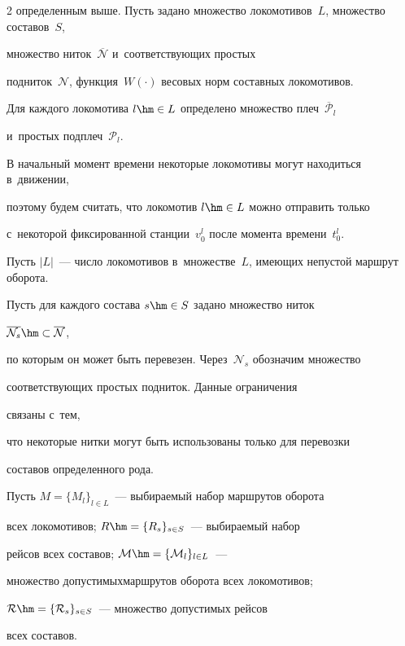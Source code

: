 \begin{multicols}{2}
определенным выше. Пусть задано множество локомотивов~$L$, множество составов~$S$, 


множество ниток~$\overline{\mathcal N}$ и~соответствующих простых 


подниток~$\mathcal N$, функция~$W(\cdot)$ весовых норм составных локомотивов. 


Для каждого локомотива $l\hm\in L$ определено множество плеч~$\overline{\mathcal P}_l$ 


и~простых подплеч~$\mathcal P_l$.





В начальный момент времени некоторые локомотивы могут находиться в~движении, 


поэтому будем считать, что локомотив $l\hm\in L$ можно отправить только 


с~некоторой фиксированной станции~$v_0^l$ после момента времени~$t_0^l$.


Пусть  $|L|$~--- число локомотивов в~множестве~$L$, имеющих непустой маршрут оборота.





Пусть для каждого состава $s\hm\in S$ задано множество ниток


 $\overline{\mathcal N_s}\hm\subset \overline{\mathcal N}$, 


 по которым он может быть перевезен. Через~$\mathcal N_s$ обозначим множество 


 соответствующих простых подниток. Данные ограничения


  связаны с~тем, 


 что некоторые нитки могут быть использованы только для перевозки 


 составов определенного рода.





Пусть $M=\{M_l\}_{l\in L}$~--- выбираемый набор маршрутов оборота 


всех локомотивов; $R \hm= \{R_s\}_{s\in S}$~--- выбираемый набор 


рейсов всех со\-ста\-вов; $\mathcal{M}\hm=\{\mathcal M_l\}_{l\in L}$~---


 множество допустимых\linebreak маршрутов оборота всех локомотивов; 


 $\mathcal {R}\hm = \{\mathcal R_s\}_{s\in S}$~--- множество допустимых рейсов


  всех составов.






\end{multicols}
